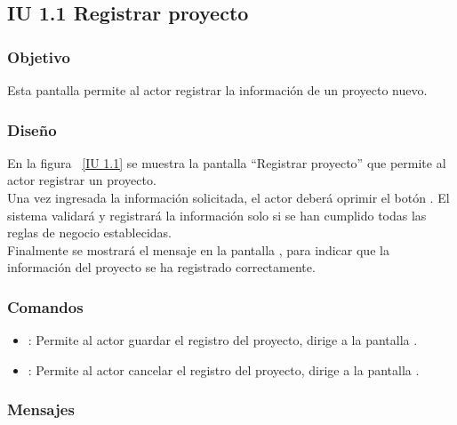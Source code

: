 \subsection{IU 1.1 Registrar proyecto}

\subsubsection{Objetivo}
	
    Esta pantalla permite al actor registrar la información de un proyecto nuevo.

\subsubsection{Diseño}

    En la figura ~\ref{IU 1.1} se muestra la pantalla ``Registrar proyecto'' que permite al actor registrar un proyecto. \\
    
    Una vez ingresada la información solicitada, el actor deberá oprimir el botón . El sistema validará y registrará la 
    información solo si se han cumplido todas las reglas de negocio establecidas.  \\
    
    Finalmente se mostrará el mensaje  en la pantalla , 
    para indicar que la información del proyecto
    se ha registrado correctamente.        



\subsubsection{Comandos}
\begin{itemize}
	\item {}: Permite al actor guardar el registro del proyecto, dirige a la pantalla .
	\item {}: Permite al actor cancelar el registro del proyecto, dirige a la pantalla .
\end{itemize}

\subsubsection{Mensajes}
	

